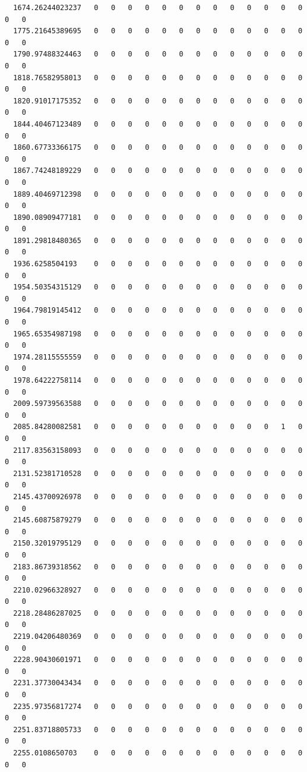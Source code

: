 \documentclass[
  letterpaper,
  DIV=11,
  numbers=noendperiod]{scrartcl}
\begin{document}
\begin{verbatim}
  1674.26244023237   0   0   0   0   0   0   0   0   0   0   0   0   0   0   0
  1775.21645389695   0   0   0   0   0   0   0   0   0   0   0   0   0   0   0
  1790.97488324463   0   0   0   0   0   0   0   0   0   0   0   0   0   0   0
  1818.76582958013   0   0   0   0   0   0   0   0   0   0   0   0   0   0   0
  1820.91017175352   0   0   0   0   0   0   0   0   0   0   0   0   0   0   0
  1844.40467123489   0   0   0   0   0   0   0   0   0   0   0   0   0   0   0
  1860.67733366175   0   0   0   0   0   0   0   0   0   0   0   0   0   0   0
  1867.74248189229   0   0   0   0   0   0   0   0   0   0   0   0   0   0   0
  1889.40469712398   0   0   0   0   0   0   0   0   0   0   0   0   0   0   0
  1890.08909477181   0   0   0   0   0   0   0   0   0   0   0   0   0   0   0
  1891.29818480365   0   0   0   0   0   0   0   0   0   0   0   0   0   0   0
  1936.6258504193    0   0   0   0   0   0   0   0   0   0   0   0   0   0   0
  1954.50354315129   0   0   0   0   0   0   0   0   0   0   0   0   0   0   0
  1964.79819145412   0   0   0   0   0   0   0   0   0   0   0   0   0   0   0
  1965.65354987198   0   0   0   0   0   0   0   0   0   0   0   0   0   0   0
  1974.28115555559   0   0   0   0   0   0   0   0   0   0   0   0   0   0   0
  1978.64222758114   0   0   0   0   0   0   0   0   0   0   0   0   0   0   0
  2009.59739563588   0   0   0   0   0   0   0   0   0   0   0   0   0   0   0
  2085.84280082581   0   0   0   0   0   0   0   0   0   0   0   1   0   0   0
  2117.83563158093   0   0   0   0   0   0   0   0   0   0   0   0   0   0   0
  2131.52381710528   0   0   0   0   0   0   0   0   0   0   0   0   0   0   0
  2145.43700926978   0   0   0   0   0   0   0   0   0   0   0   0   0   0   0
  2145.60875879279   0   0   0   0   0   0   0   0   0   0   0   0   0   0   0
  2150.32019795129   0   0   0   0   0   0   0   0   0   0   0   0   0   0   0
  2183.86739318562   0   0   0   0   0   0   0   0   0   0   0   0   0   0   0
  2210.02966328927   0   0   0   0   0   0   0   0   0   0   0   0   0   0   0
  2218.28486287025   0   0   0   0   0   0   0   0   0   0   0   0   0   0   0
  2219.04206480369   0   0   0   0   0   0   0   0   0   0   0   0   0   0   0
  2228.90430601971   0   0   0   0   0   0   0   0   0   0   0   0   0   0   0
  2231.37730043434   0   0   0   0   0   0   0   0   0   0   0   0   0   0   0
  2235.97356817274   0   0   0   0   0   0   0   0   0   0   0   0   0   0   0
  2251.83718805733   0   0   0   0   0   0   0   0   0   0   0   0   0   0   0
  2255.0108650703    0   0   0   0   0   0   0   0   0   0   0   0   0   0   0

\end{verbatim}
\end{document}
